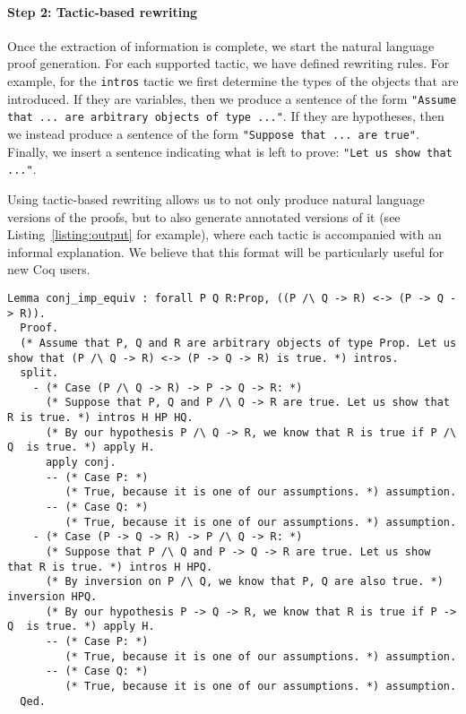 \documentclass[sigplan,9pt]{acmart}\settopmatter{printfolios=true,printccs=false,printacmref=false}
\begin{document}
\paragraph{Step 2: Tactic-based rewriting}
Once the extraction of information is complete, we start the natural language proof generation. For each supported tactic, we have defined rewriting rules. For example, for the \lstinline{intros} tactic we first determine the types of the objects that are introduced. If they are variables, then we produce a sentence of the form \lstinline{"Assume that ... are arbitrary objects of type ..."}. If they are hypotheses, then we instead produce a sentence of the form \lstinline{"Suppose that ... are true"}. Finally, we insert a sentence indicating what is left to prove: \lstinline{"Let us show that ..."}. 

Using tactic-based rewriting allows us to not only produce natural language versions of the proofs, but to also generate annotated versions of it (see Listing~\ref{listing:output} for example), where each tactic is accompanied with an informal explanation. We believe that this format will be particularly useful for new Coq users.

\begin{figure*}
\begin{lstlisting}[label=listing:output, captionpos=b, caption={Output}]
  Lemma conj_imp_equiv : forall P Q R:Prop, ((P /\ Q -> R) <-> (P -> Q -> R)).
  Proof.
  (* Assume that P, Q and R are arbitrary objects of type Prop. Let us show that (P /\ Q -> R) <-> (P -> Q -> R) is true. *) intros.
  split.
    - (* Case (P /\ Q -> R) -> P -> Q -> R: *) 
      (* Suppose that P, Q and P /\ Q -> R are true. Let us show that R is true. *) intros H HP HQ.
      (* By our hypothesis P /\ Q -> R, we know that R is true if P /\ Q  is true. *) apply H.
      apply conj.
      -- (* Case P: *)
         (* True, because it is one of our assumptions. *) assumption.
      -- (* Case Q: *)
         (* True, because it is one of our assumptions. *) assumption.
    - (* Case (P -> Q -> R) -> P /\ Q -> R: *)
      (* Suppose that P /\ Q and P -> Q -> R are true. Let us show that R is true. *) intros H HPQ.
      (* By inversion on P /\ Q, we know that P, Q are also true. *) inversion HPQ.
      (* By our hypothesis P -> Q -> R, we know that R is true if P -> Q  is true. *) apply H.
      -- (* Case P: *)
         (* True, because it is one of our assumptions. *) assumption.
      -- (* Case Q: *)
         (* True, because it is one of our assumptions. *) assumption.
  Qed.
\end{lstlisting}
\end{figure*}
\end{document}
